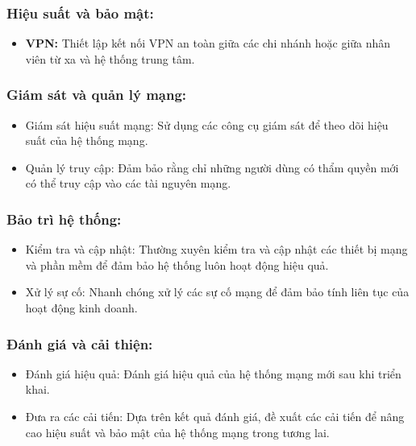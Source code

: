 \documentclass[13pt]{article}
\begin{document}
\subsubsection{Hiệu suất và bảo mật:}
\begin{itemize}
    \item \textbf{VPN: }Thiết lập kết nối VPN an toàn giữa các chi nhánh hoặc giữa nhân viên từ xa và hệ thống trung tâm.
\end{itemize}

\subsubsection{Giám sát và quản lý mạng:}
\begin{itemize}
    \item Giám sát hiệu suất mạng: Sử dụng các công cụ giám sát để theo dõi hiệu suất của hệ thống mạng.
    \item Quản lý truy cập: Đảm bảo rằng chỉ những người dùng có thẩm quyền mới có thể truy cập vào các tài nguyên mạng.
\end{itemize}

\subsubsection{Bảo trì hệ thống:}
\begin{itemize}
    \item Kiểm tra và cập nhật: Thường xuyên kiểm tra và cập nhật các thiết bị mạng và phần mềm để đảm bảo hệ thống luôn hoạt động hiệu quả.
    \item Xử lý sự cố: Nhanh chóng xử lý các sự cố mạng để đảm bảo tính liên tục của hoạt động kinh doanh.
\end{itemize}

\subsubsection{Đánh giá và cải thiện:}
\begin{itemize}
    \item Đánh giá hiệu quả: Đánh giá hiệu quả của hệ thống mạng mới sau khi triển khai.
    \item Đưa ra các cải tiến: Dựa trên kết quả đánh giá, đề xuất các cải tiến để nâng cao hiệu suất và bảo mật của hệ thống mạng trong tương lai.
\end{itemize}
\end{document}
